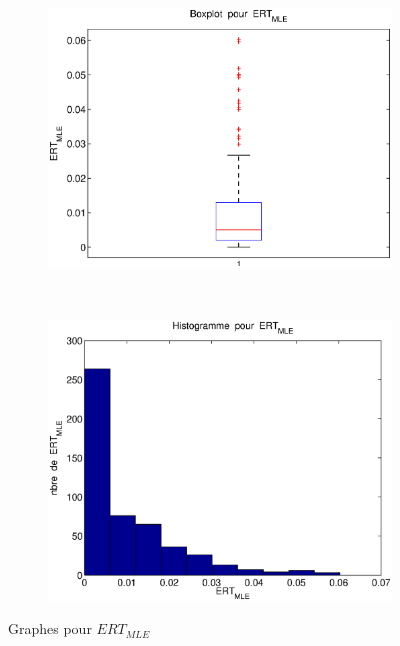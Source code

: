 \begin{figure}[!ht]
        \centering
        \begin{subfigure}[b]{0.5\textwidth}
                \includegraphics[width=\textwidth]{graphes/boxplot_ertmle.eps}
        \end{subfigure}%
        ~ 
        \begin{subfigure}[b]{0.5\textwidth}
                \includegraphics[width=\textwidth]{graphes/hist_ertmle.eps}
        \end{subfigure}
        \caption{Graphes pour $ERT_{MLE}$}\label{fig:ertmle}
\end{figure}

